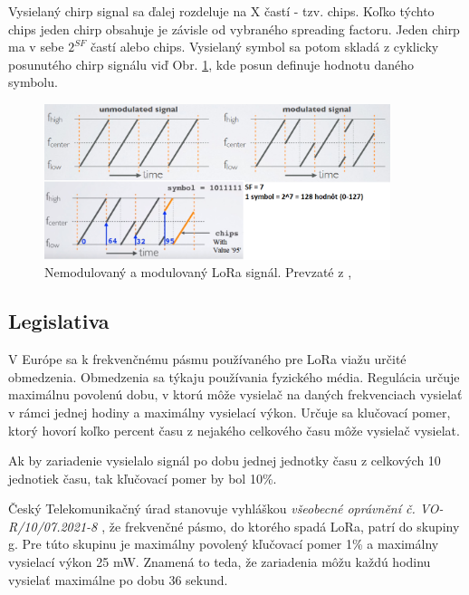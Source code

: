 \documentclass[slovak,master]{diploma}
\begin{document}
Vysielaný chirp signal sa ďalej rozdeluje na X častí - tzv. chips. Koľko týchto chips jeden chirp obsahuje je závisle od vybraného spreading factoru. 
Jeden chirp ma v sebe $2^{SF}$ častí alebo chips. Vysielaný symbol sa potom skladá z cyklicky posunutého chirp signálu viď 
Obr. \ref{fig:loraModulation}, kde posun definuje hodnotu daného symbolu.
\begin{figure}
	\centering
	\includegraphics[width=0.9\textwidth]{Figures/loraModulation.png}
	\caption{Nemodulovaný a modulovaný LoRa signál. Prevzaté z \cite{loraMod}, \cite{loraMod2}}
	\label{fig:loraModulation}
\end{figure}

\subsection{Legislativa}
V Európe sa k frekvenčnému pásmu používaného pre LoRa viažu určité obmedzenia. 
Obmedzenia sa týkaju používania fyzického média. Regulácia určuje maximálnu povolenú dobu, v ktorú môže vysielač na daných frekvenciach vysielať 
v rámci jednej hodiny a maximálny vysielací výkon.
Určuje sa klučovací pomer, ktorý hovorí koľko percent času z nejakého celkového času môže vysielač vysielat.

Ak by zariadenie vysielalo signál po dobu jednej jednotky času z celkových 10 jednotiek času, tak kľučovací pomer by bol 10\%.

Český Telekomunikačný úrad \cite{ctu} stanovuje vyhláškou \textit{všeobecné oprávnění č. VO-R/10/07.2021-8 \cite{vor}}, že 
frekvenčné pásmo, do ktorého spadá LoRa, patrí do skupiny g. Pre túto skupinu je maximálny povolený kľučovací pomer 1\% a maximálny 
vysielací výkon 25 mW. Znamená to teda, že zariadenia môžu každú hodinu vysielať maximálne po dobu 36 sekund.
\end{document}
